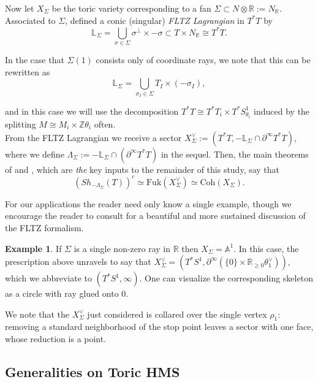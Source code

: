 \documentclass[11pt]{amsart}
\theoremstyle{definition}
\newtheorem{exmp}[thm]{Example}
\theoremstyle{remark}
\newcommand{\Coh}{\mathrm{Coh}}
\newcommand{\Fuk}{\mathrm{Fuk}}
\numberwithin{equation}{section}
\begin{document}
Now let $X_\Sigma$ be the toric variety  corresponding to a fan $\Sigma \subset N \otimes \mathbb{R} := N_\mathbb{R}$. Associated to $\Sigma$, \cite{FLTZ} defined a conic (singular) \textit{FLTZ Lagrangian} in $T^* T$ by $$\mathbb{L}_\Sigma = \bigcup_{\sigma \in \Sigma} \sigma^\perp \times -\sigma \subset T \times N_\mathbb{R} \cong T^* T.$$

In the case that $\Sigma(1)$ consists only of coordinate rays, we note that this can be rewritten as $$\mathbb{L}_\Sigma = \bigcup_{\sigma_I \in \Sigma} T_I \times (-\sigma_I),$$

\noindent and in this case we will use the decomposition $T^* T \cong T^* T_i \times T^* S^1_{\theta_i}$ induced by the splitting $M \cong M_i \times \mathbb{Z}\theta_i$ often.\\

From the FLTZ Lagrangian we receive a sector $X_\Sigma^\vee := (T^* T, -\mathbb{L}_\Sigma \cap \partial^\infty T^* T)$, where we define $\Lambda_\Sigma := -\mathbb{L}_\Sigma \cap (\partial^\infty T^* T)$ in the sequel. Then, the main theorems of \cite{FLTZ} and \cite{Kuwagaki}, which are \textit{the} key inputs to the remainder of this study, say that $$(Sh_{-\Lambda_\Sigma} ( T))^c \simeq \Fuk(X_\Sigma^\vee) \simeq \Coh(X_\Sigma) .$$

For our applications the reader need only know a single example, though we encourage the reader to consult \cite{GammageThesis} for a beautiful and more sustained discussion of the FLTZ formalism.

\begin{exmp}\label{affine space toric example}
    If $\Sigma$ is a single non-zero ray in $\mathbb{R}$ then $X_\Sigma = \mathbb{A}^1$. In this case, the prescription above unravels to say that $X^\vee_\Sigma=(T^*S^1,\partial^\infty(\{0\}\times\mathbb R_{\ge0}\theta_1^\vee))$, which we abbreviate to $(T^*S^1,\infty)$. One can visualize the corresponding skeleton as a circle with ray glued onto $0$.
\end{exmp}

We note that the $X^\vee_\Sigma$ just considered is collared over the single vertex $\rho_1$: removing a standard neighborhood of the stop point leaves a sector with one face, whose reduction is a point.

\subsection{Generalities on Toric HMS}
\end{document}
